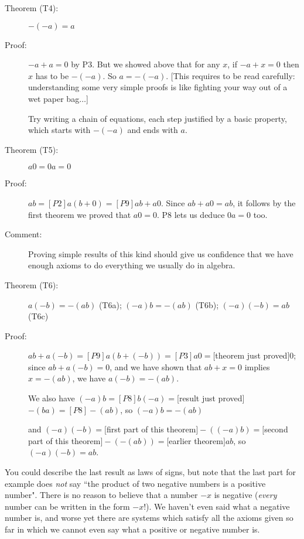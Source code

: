 \documentclass[12pt]{article}
\begin{document}
\begin{description}

\item[Theorem (T4):]  $-(-a)=a$

\item[Proof:]  $-a+a=0$ by P3.  But we showed above that for any $x$, if $-a+x=0$ then $x$ has to be $-(-a)$.
So $a=-(-a)$.  [This requires to be read carefully:  understanding some very simple proofs is like fighting your way out of a wet paper bag$\ldots$]

Try writing a chain of equations, each step justified by a basic property, which starts with $-(-a)$ and ends with $a$.

\item[Theorem (T5):] $a0 = 0a = 0$

\item[Proof:]  $ab =[P2] a(b+0) =[P9] ab+a0$.  Since $ab+a0 = ab$, it follows by the first theorem we proved that $a0=0$.  P8 lets us deduce $0a=0$ too.

\item[Comment:]  Proving simple results of this kind should give us confidence that we have enough axioms to do everything we usually do in algebra.

\item[Theorem (T6):]  $a(-b)=-(ab)$ (T6a); $(-a)b=-(ab)$ (T6b); $(-a)(-b)=ab$ (T6c)

\item[Proof:]  $ab + a(-b) = [P9] a(b+(-b)) = [P3]a0=[$theorem just proved$]0$; since $ab+a(-b)=0$, and we have shown that $ab+x=0$ implies $x=-(ab)$, we have $a(-b)=-(ab)$.

We also have $(-a)b=[P8]b(-a)=$[result just proved]$-(ba)=[P8]-(ab)$, so $(-a)b=-(ab)$

and $(-a)(-b)=[$first part of this theorem$]-((-a)b)=[$second part of this theorem$]-(-(ab))=[$earlier theorem$]ab$, so $(-a)(-b)=ab$.

\end{description}

You could describe the last result as laws of signs, but note that the last part for example does {\em not\/} say ``the product of two negative numbers  is a positive number".  There is no reason to believe that a number $-x$ is negative ({\em every\/} number can be written in the form $-x$!).  We haven't even said what a negative number is, and worse yet there are systems which satisfy all the axioms given so far in which we cannot even say what a positive or negative number is.
\end{document}
